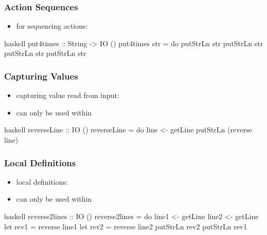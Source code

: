 \documentclass[dvipsnames]{beamer}
\theoremstyle{plain}
\begin{document}
\begin{frame}[fragile]
  \frametitle{Action Sequences}

  \begin{itemize}
    \item for sequencing actions: 
  \end{itemize}

  \begin{exampleblock}{}
    \begin{pygments}{haskell}
put4times :: String -> IO ()
put4times str = do
    putStrLn str
    putStrLn str
    putStrLn str
    putStrLn str
    \end{pygments}
  \end{exampleblock}
\end{frame}

\begin{frame}[fragile]
  \frametitle{Capturing Values}

  \begin{itemize}
    \item capturing value read from input: 
    \item can only be used within 
  \end{itemize}

  \begin{exampleblock}{}
    \begin{pygments}{haskell}
reverseLine :: IO ()
reverseLine = do
    line <- getLine
    putStrLn (reverse line)
    \end{pygments}
  \end{exampleblock}
\end{frame}

\begin{frame}[fragile]
  \frametitle{Local Definitions}

  \begin{itemize}
    \item local definitions: 
    \item can only be used within 
  \end{itemize}

  \begin{exampleblock}{}
    \begin{pygments}{haskell}
reverse2lines :: IO ()
reverse2lines = do
    line1 <- getLine
    line2 <- getLine
    let rev1 = reverse line1
    let rev2 = reverse line2
    putStrLn rev2
    putStrLn rev1
    \end{pygments}
  \end{exampleblock}
\end{frame}
\end{document}

